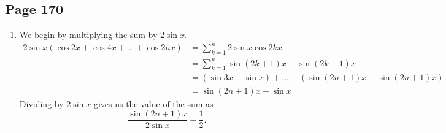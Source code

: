 \documentclass{article}
\newenvironment{solutions}[1]
{\subsection*{#1}
 \begin{enumerate}[leftmargin=1.5em]}
{\end{enumerate}}
\newcommand{\solution}{\item}
\begin{document}
\begin{solutions}{Page 170}
An alternative way to evaluate this sum is by noticing that the terms of this sum repeat in periods of 8 because $\sin\left(x+\tfrac{8\pi}{4}\right)=\sin\left(x\right)$. Furthermore, the first 8 terms of the sum total to zero (try verifying this yourself using the sine addition formulas). Therefore, to evaluate the whole sum, all we need to evaluate is the sum of the last four terms:
\[
\sin\left(x+\dfrac{96\pi}{4}\right) + \sin\left(x+\dfrac{97\pi}{4}\right) + \sin\left(x+\dfrac{98\pi}{4}\right) + \sin\left(x+\dfrac{99\pi}{4}\right).
\]
By the periodicity in the sum, we can equivalently evaluate the first four terms of the sum. Using the sine addition formulas, we find that the sum is equal to
\begin{align*}
&\sin{x}+\sin\left(x+\dfrac{\pi}{4}\right)+\sin\left(x+\dfrac{\pi}{2}\right)+\sin\left(x+\dfrac{3\pi}{4}\right) \\
&\qquad= \sin{x} + \dfrac{\sqrt{2}}{2}\sin{x} + \dfrac{\sqrt{2}}{2}\cos{x} + \cos{x} - \dfrac{\sqrt{2}}{2}\sin{x} + \dfrac{\sqrt{2}}{2}\cos{x} \\
&\qquad= \sin{x} + \cos{x} + \sqrt{2}\cos{x}.
\end{align*}
Combining this result with our initial evaluation of this sum shows that $\cot{\tfrac{\pi}{8}} = 1 + \sqrt{2}$.

\solution %
We begin by multiplying the sum by $2\sin{x}$.
\begin{align*}
2\sin{x}\left(\cos{2x}+\cos{4x}+\ldots+\cos{2nx}\right) &= \sum_{k=1}^{n} 2\sin{x}\cos{2kx} \\
&= \sum_{k=1}^{n} \sin{(2k+1)x} - \sin{(2k-1)x} \\
&= \left(\sin{3x}-\sin{x}\right) + \ldots + \left(\sin{(2n+1)x} - \sin{(2n+1)x}\right) \\
&= \sin{(2n+1)x} - \sin{x}
\end{align*}
Dividing by $2\sin{x}$ gives us the value of the sum as
\[
\dfrac{\sin(2n+1)x}{2\sin{x}} - \dfrac{1}{2}.
\]


\end{solutions}
\end{document}

